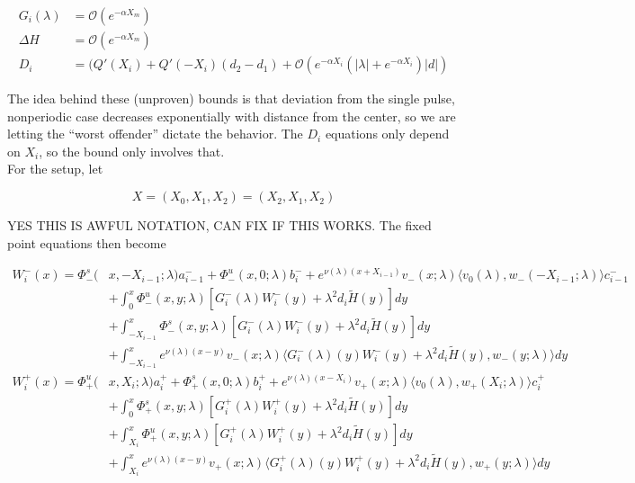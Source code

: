 \documentclass[12pt]{article}
\begin{document}
\begin{align*}
G_i(\lambda) &= \mathcal{O}(e^{-\alpha X_m}) \\
\Delta H &= \mathcal{O}(e^{-\alpha X_m}) \\
D_i &= ( Q'(X_i) + Q'(-X_i)(d_2 - d_1 ) + \mathcal{O} \left( e^{-\alpha X_i} \left( |\lambda| +  e^{-\alpha X_i}  \right) |d| \right)
\end{align*}

The idea behind these (unproven) bounds is that deviation from the single pulse, nonperiodic case decreases exponentially with distance from the center, so we are letting the ``worst offender'' dictate the behavior. The $D_i$ equations only depend on $X_i$, so the bound only involves that. \\

For the setup, let

\[
X = (X_0, X_1, X_2) = (X_2, X_1, X_2)
\]

YES THIS IS AWFUL NOTATION, CAN FIX IF THIS WORKS. The fixed point equations then become

\begin{align*}
W_i^-(x) = \Phi^s_-(&x, -X_{i-1}; \lambda)a_{i-1}^- + \Phi^u_-(x, 0; \lambda)b_i^- + e^{\nu(\lambda)(x+X_{i-1})} v_-(x; \lambda) \langle v_0(\lambda), w_-(-X_{i-1}; \lambda) \rangle c_{i-1}^- \\
&+ \int_0^x \Phi^u_-(x, y; \lambda)[ G_i^-(\lambda)W_i^-(y) + \lambda^2 d_i \tilde{H}(y) ] dy \\
&+ \int_{-X_{i-1}}^x \Phi^s_-(x, y; \lambda) [ G_i^-(\lambda)W_i^-(y) + \lambda^2 d_i \tilde{H}(y) ] dy \\
&+ \int_{-X_{i-1}}^x 
e^{\nu(\lambda)(x-y)} v_-(x; \lambda) \langle G_i^-(\lambda)(y)W_i^-(y) + \lambda^2 d_i \tilde{H}(y), w_-(y; \lambda) \rangle dy \\
W_i^+(x) = \Phi^u_+(&x, X_i; \lambda)a_i^+ + \Phi^s_+(x, 0; \lambda)b_i^+ + e^{\nu(\lambda)(x - X_i)} v_+(x; \lambda) \langle v_0(\lambda), w_+(X_i; \lambda) \rangle c_i^+ \\
&+ \int_0^x \Phi^s_+(x, y; \lambda) [ G_i^+(\lambda)W_i^+(y) + \lambda^2 d_i \tilde{H}(y) ] dy \\
&+ \int_{X_i}^x \Phi^u_+(x, y; \lambda) [ G_i^+(\lambda)W_i^+(y) + \lambda^2 d_i \tilde{H}(y) ] dy \\
&+ \int_{X_i}^x e^{\nu(\lambda)(x-y)} v_+(x; \lambda) \langle G_i^+(\lambda)(y)W_i^+(y) + \lambda^2 d_i \tilde{H}(y), w_+(y; \lambda) \rangle dy
\end{align*}
\end{document}
